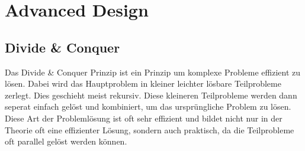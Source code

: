 \documentclass[
../AuD-Zusammenfassung.tex,
]
{subfiles}
\begin{document}
\section{Advanced Design}
\subsection{Divide \& Conquer}
Das Divide \& Conquer Prinzip ist ein Prinzip um komplexe Probleme effizient zu lösen. Dabei wird das Hauptproblem in kleiner leichter lösbare Teilprobleme zerlegt. Dies geschieht meist rekursiv. Diese kleineren Teilprobleme werden dann seperat einfach gelöst und kombiniert, um das ursprüngliche Problem zu lösen. Diese Art der Problemlösung ist oft sehr effizient und bildet nicht nur in der Theorie oft eine effizienter Lösung, sondern auch praktisch, da die Teilprobleme oft parallel gelöst werden können.
\end{document}
